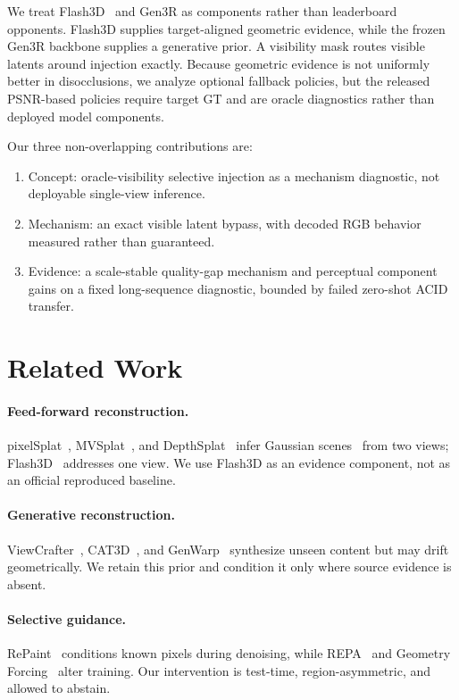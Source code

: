 \documentclass[10pt,twocolumn,letterpaper]{article}
\begin{document}
We treat Flash3D~\cite{flash3d} and Gen3R as components rather than leaderboard
opponents. Flash3D supplies target-aligned geometric evidence, while the frozen
Gen3R backbone supplies a generative prior. A visibility mask routes visible latents around injection exactly. Because
geometric evidence is not uniformly better in disocclusions, we analyze optional
fallback policies, but the released PSNR-based policies require target GT and are
oracle diagnostics rather than deployed model components.

Our three non-overlapping contributions are:
\begin{enumerate}
\item Concept: oracle-visibility selective injection as a mechanism diagnostic, not deployable single-view inference.
\item Mechanism: an exact visible latent bypass, with decoded RGB behavior measured rather than guaranteed.
\item Evidence: a scale-stable quality-gap mechanism and perceptual component gains on a fixed long-sequence diagnostic, bounded by failed zero-shot ACID transfer.
\end{enumerate}

\section{Related Work}
\paragraph{Feed-forward reconstruction.}
pixelSplat~\cite{pixelsplat}, MVSplat~\cite{mvsplat}, and
DepthSplat~\cite{depthsplat} infer Gaussian scenes~\cite{gaussiansplatting} from
two views; Flash3D~\cite{flash3d} addresses one view. We use Flash3D as an
evidence component, not as an official reproduced baseline.
\paragraph{Generative reconstruction.}
ViewCrafter~\cite{viewcrafter}, CAT3D~\cite{cat3d}, and
GenWarp~\cite{genwarp} synthesize unseen content but may drift geometrically. We
retain this prior and condition it only where source evidence is absent.
\paragraph{Selective guidance.}
RePaint~\cite{repaint} conditions known pixels during denoising, while
REPA~\cite{repa} and Geometry Forcing~\cite{geometryforcing} alter training. Our
intervention is test-time, region-asymmetric, and allowed to abstain.
\end{document}
